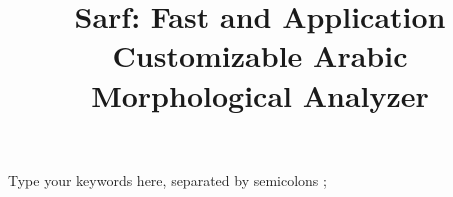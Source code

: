 \documentclass[3p,times,procedia]{elsarticle}
\begin{document}
\begin{frontmatter}

%

\title{Sarf: Fast and Application Customizable Arabic Morphological Analyzer}







\begin{abstract}

\end{abstract}

\begin{keyword}
Type your keywords here, separated by semicolons ; 




\end{keyword}
\end{frontmatter}

\end{document}
